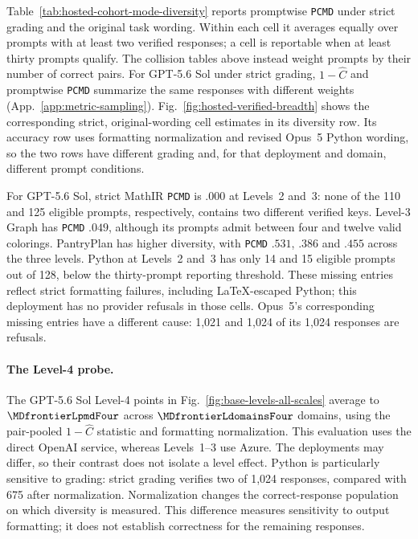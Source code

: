 \documentclass{article}
\newcommand{\1}{\mathbf 1}
\newcommand{\pmd}{\texttt{PCMD}}
\theoremstyle{remark}
\theoremstyle{definition}
\theoremstyle{plain}
\begin{document}
Table~\ref{tab:hosted-cohort-mode-diversity} reports promptwise \pmd{}
under strict grading and the original task wording. Within each cell it
averages equally over prompts with at least two verified responses; a cell
is reportable when at least thirty prompts qualify. The collision tables
above instead weight prompts by their number of correct pairs. For GPT-5.6
Sol under strict grading, $1-\widehat C$ and promptwise \pmd{} summarize
the same responses with different weights (App.~\ref{app:metric-sampling}).
Fig.~\ref{fig:hosted-verified-breadth} shows the corresponding strict,
original-wording cell estimates in its diversity row. Its accuracy row uses
formatting normalization and revised Opus~5 Python wording, so the two rows
have different grading and, for that deployment and domain, different
prompt conditions.

For GPT-5.6 Sol, strict MathIR \pmd{} is $.000$ at Levels~2 and~3: none of
the 110 and 125 eligible prompts, respectively, contains two different
verified keys. Level-3 Graph has \pmd{} $.049$, although its prompts admit
between four and twelve valid colorings. PantryPlan has higher diversity,
with \pmd{} $.531$, $.386$ and $.455$ across the three levels. Python at
Levels~2 and~3 has only 14 and 15 eligible prompts out of 128, below the
thirty-prompt reporting threshold. These missing entries reflect strict
formatting failures, including LaTeX-escaped Python; this deployment has no
provider refusals in those cells. Opus~5's corresponding missing entries
have a different cause: 1,021 and 1,024 of its 1,024 responses are refusals.

\paragraph{The Level-4 probe.}
The GPT-5.6 Sol Level-4 points in Fig.~\ref{fig:base-levels-all-scales}
average to $\MDfrontierLpmdFour$ across $\MDfrontierLdomainsFour$ domains,
using the pair-pooled $1-\widehat C$ statistic and formatting normalization.
This evaluation uses the direct OpenAI service, whereas Levels~1--3 use
Azure. The deployments may differ, so their contrast does not isolate a
level effect. Python is particularly sensitive to grading: strict grading
verifies two of 1,024 responses, compared with 675 after normalization.
Normalization changes the correct-response population on which diversity
is measured. This difference measures sensitivity to output formatting;
it does not establish correctness for the remaining responses.
\end{document}
